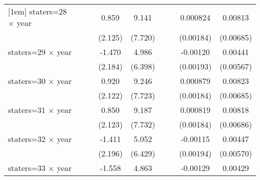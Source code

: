 {\begin{longtable}{l*{8}{c}}
[1em]
staters=28 $\times$ year&                     &                     &       0.859         &       9.141         &                     &                     &    0.000824         &     0.00813         \\
                    &                     &                     &     (2.125)         &     (7.720)         &                     &                     &   (0.00184)         &   (0.00685)         \\
[1em]
staters=29 $\times$ year&                     &                     &      -1.470         &       4.986         &                     &                     &    -0.00120         &     0.00441         \\
                    &                     &                     &     (2.184)         &     (6.398)         &                     &                     &   (0.00193)         &   (0.00567)         \\
[1em]
staters=30 $\times$ year&                     &                     &       0.920         &       9.246         &                     &                     &    0.000879         &     0.00823         \\
                    &                     &                     &     (2.122)         &     (7.723)         &                     &                     &   (0.00184)         &   (0.00685)         \\
[1em]
staters=31 $\times$ year&                     &                     &       0.850         &       9.187         &                     &                     &    0.000819         &     0.00818         \\
                    &                     &                     &     (2.123)         &     (7.732)         &                     &                     &   (0.00184)         &   (0.00686)         \\
[1em]
staters=32 $\times$ year&                     &                     &      -1.411         &       5.052         &                     &                     &    -0.00115         &     0.00447         \\
                    &                     &                     &     (2.196)         &     (6.429)         &                     &                     &   (0.00194)         &   (0.00570)         \\
[1em]
staters=33 $\times$ year&                     &                     &      -1.558         &       4.863         &                     &                     &    -0.00129         &     0.00429         \\

\end{longtable}}
